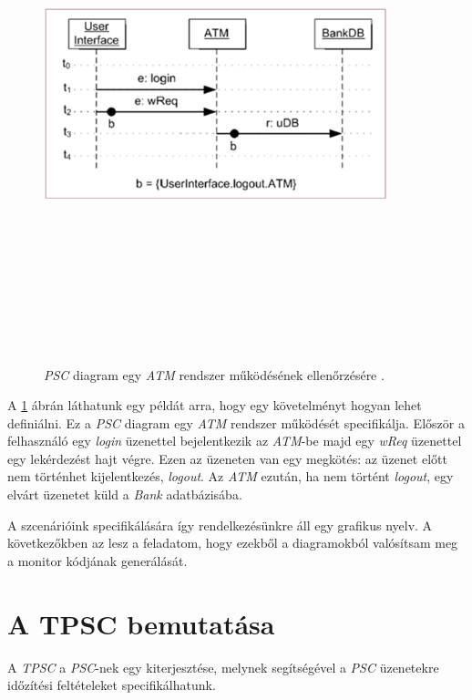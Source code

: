 \begin{figure}[!ht]
    \centering
    \includegraphics[width=100mm, height=15cm, keepaspectratio]{figures/3abra.png}
    \caption{\textit{PSC} diagram egy \textit{ATM} rendszer működésének ellenőrzésére \cite{PSC1}.}
    \label{psc_példa}
\end{figure}
A \ref{psc_példa} ábrán láthatunk egy példát arra, hogy egy követelményt hogyan lehet definiálni.
Ez a \textit{PSC} diagram egy \textit{ATM} rendszer működését specifikálja.
Először a felhasználó egy \textit{login} üzenettel bejelentkezik az \textit{ATM}-be majd egy \textit{wReq} üzenettel egy lekérdezést hajt végre.
Ezen az üzeneten van egy megkötés: az üzenet előtt nem történhet kijelentkezés, \textit{logout}.
Az \textit{ATM} ezután, ha nem történt \textit{logout}, egy elvárt üzenetet küld a \textit{Bank} adatbázisába.

A szcenárióink specifikálására így rendelkezésünkre áll egy grafikus nyelv.
A következőkben az lesz a feladatom, hogy ezekből a diagramokból valósítsam meg a monitor kódjának generálását.

\section{A TPSC bemutatása}
A \textit{TPSC} \cite{TPSC1} a \textit{PSC}-nek egy kiterjesztése, melynek segítségével a \textit{PSC} üzenetekre időzítési feltételeket specifikálhatunk.

